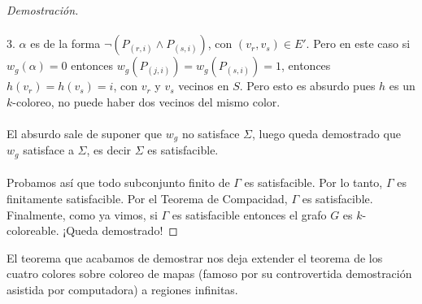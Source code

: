 \documentclass[12pt]{article}
\newenvironment{observacion}[2][Observación]{\begin{trivlist}
\item[\hskip \labelsep {\bfseries #1}\hskip \labelsep {\bfseries #2}]}{\end{trivlist}}
\newenvironment{dem}{\begin{proof}[Demostración]}{\end{proof}}
\begin{document}
\begin{dem}
\\ \\3. $\alpha$ es de la forma $\neg(P_{(r,i)} \land P_{(s,i)})$, con $(v_r, v_s) \in E'$. Pero en este caso si $w_g(\alpha) = 0$ entonces $w_g(P_{(j,i)}) = w_g(P_{(s,i)}) = 1$, entonces $h(v_r) = h(v_s) = i$, con $v_r$ y $v_s$ vecinos en $S$. Pero esto es absurdo pues $h$ es un $k$-coloreo, no puede haber dos vecinos del mismo color.
\\ \\ El absurdo sale de suponer que $w_g$ no satisface $\Sigma$, luego queda demostrado que $w_g$ satisface a $\Sigma$, es decir $\Sigma$ es satisfacible.
\\ \\ Probamos así que todo subconjunto finito de $\Gamma$ es satisfacible. Por lo tanto, $\Gamma$ es finitamente satisfacible. Por el Teorema de Compacidad, $\Gamma$ es satisfacible. Finalmente, como ya vimos, si $\Gamma$ es satisfacible entonces el grafo $G$ es $k$-coloreable. ¡Queda demostrado!
\end{dem}
 
\begin{observacion}{} El teorema que acabamos de demostrar nos deja extender el teorema de los cuatro colores sobre coloreo de mapas (famoso por su controvertida demostración asistida por computadora) a regiones infinitas.
\end{observacion}
\end{document}
